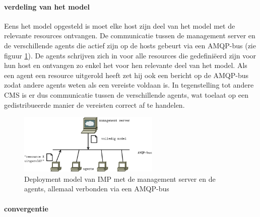 \paragraph{verdeling van het model}
Eens het model opgesteld is moet elke host zijn deel van het model met de relevante resources ontvangen.
De communicatie tussen de management server en de verschillende agents die actief zijn op de hosts gebeurt via een AMQP-bus (zie figuur \ref{fig:IMP_architectuur}).
De agents schrijven zich in voor alle resources die gedefini\"eerd zijn voor hun host en ontvangen zo enkel het voor hen relevante deel van het model.
Als een agent een resource uitgerold heeft zet hij ook een bericht op de AMQP-bus zodat andere agents weten als een vereiste voldaan is.
In tegenstelling tot andere CMS is er dus communicatie tussen de verschillende agents, wat toelaat op een gedistribueerde manier de vereisten correct af te handelen. 

\begin{figure}[h]
    \begin{center}
    \includegraphics[width=0.6\textwidth]{images/IMP_architectuur.pdf}
    \caption{Deployment model van IMP met de management server en de agents, allemaal verbonden via een AMQP-bus}
    \label{fig:IMP_architectuur}
    \end{center}
\end{figure}

\paragraph{convergentie}


